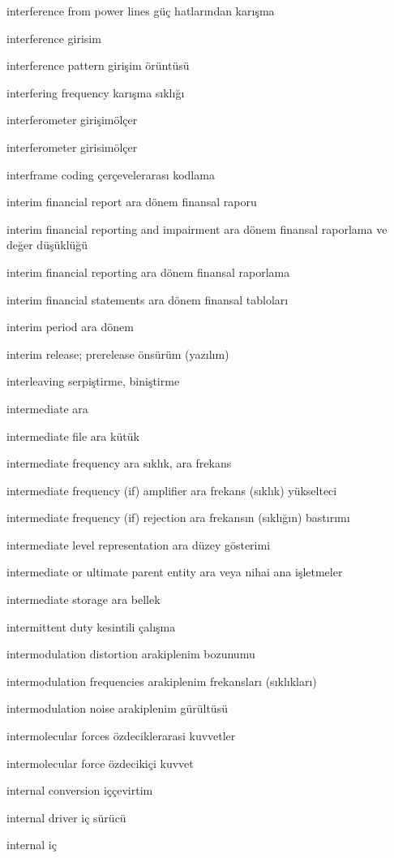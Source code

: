 \documentclass[12pt,fleqn]{article}\usepackage{../../common}
\begin{document}
interference from power lines güç hatlarından karışma

interference girisim

interference pattern girişim örüntüsü

interfering frequency karışma sıklığı

interferometer girişimölçer

interferometer girisimölçer

interframe coding çerçevelerarası kodlama

interim financial report ara dönem finansal raporu

interim financial reporting and impairment ara dönem finansal raporlama ve değer düşüklüğü

interim financial reporting ara dönem finansal raporlama

interim financial statements ara dönem finansal tabloları

interim period ara dönem

interim release; prerelease önsürüm (yazılım)

interleaving serpiştirme, biniştirme

intermediate ara

intermediate file ara kütük

intermediate frequency ara sıklık, ara frekans

intermediate frequency (if) amplifier ara frekans (sıklık) yükselteci

intermediate frequency (if) rejection ara frekansın (sıklığın) bastırımı

intermediate level representation ara düzey gösterimi

intermediate or ultimate parent entity ara veya nihai ana işletmeler

intermediate storage ara bellek

intermittent duty kesintili çalışma

intermodulation distortion arakiplenim bozunumu

intermodulation frequencies arakiplenim frekansları (sıklıkları)

intermodulation noise arakiplenim gürültüsü

intermolecular forces özdeciklerarasi kuvvetler

intermolecular force özdecikiçi kuvvet

internal conversion iççevirtim

internal driver iç sürücü

internal iç
\end{document}
